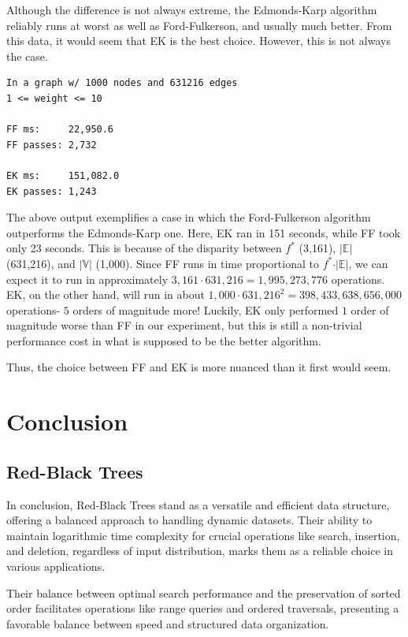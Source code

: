\documentclass[12pt]{amsart}
\begin{document}
    Although the difference is not always extreme, the
    Edmonds-Karp algorithm reliably runs at worst as well as
    Ford-Fulkerson, and usually much better. From this data, it
    would seem that EK is the best choice. However, this is not
    always the case.

\begin{verbatim}
In a graph w/ 1000 nodes and 631216 edges
1 <= weight <= 10

FF ms:     22,950.6
FF passes: 2,732

EK ms:     151,082.0
EK passes: 1,243

\end{verbatim}

    The above output exemplifies a case in which the
    Ford-Fulkerson algorithm outperforms the Edmonds-Karp one.
    Here, EK ran in 151 seconds, while FF took only 23 seconds.
    This is because of the disparity between $f^*$ (3,161),
    $\vert \mathbb{E} \vert$ (631,216), and
    $\vert \mathbb{V} \vert$ (1,000). Since FF runs in time
    proportional to $f^* \cdot \vert \mathbb{E} \vert$, we can
    expect it to run in approximately
    $3,161 \cdot 631,216 = 1,995,273,776$ operations. EK, on the
    other hand, will run in about
    $1,000 \cdot 631,216^2 = 398,433,638,656,000$ operations-
    $5$ orders of magnitude more! Luckily, EK only performed $1$
    order of magnitude worse than FF in our experiment, but this
    is still a non-trivial performance cost in what is supposed
    to be the better algorithm.

    Thus, the choice between FF and EK is more nuanced than it
    first would seem.

\section{Conclusion}

\subsection{Red-Black Trees}
    
    In conclusion, Red-Black Trees stand as a versatile and efficient data structure,
    offering a balanced approach to handling dynamic datasets. Their ability to 
    maintain logarithmic time complexity for crucial operations like search, 
    insertion, and deletion, regardless of input distribution, marks them as a 
    reliable choice in various applications.

    Their balance between optimal search performance and the preservation of sorted 
    order facilitates operations like range queries and ordered traversals, presenting
    a favorable balance between speed and structured data organization.
\end{document}
